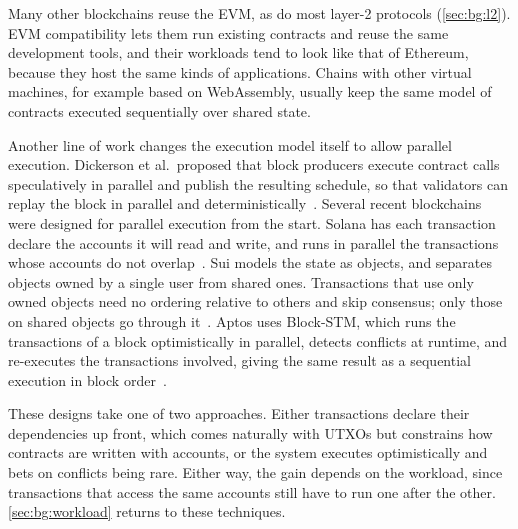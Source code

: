 Many other blockchains reuse the EVM, as do most layer-2 protocols (\autoref{sec:bg:l2}).
EVM compatibility lets them run existing contracts and reuse the same development tools, and their workloads tend to look like that of Ethereum, because they host the same kinds of applications.
Chains with other virtual machines, for example based on WebAssembly, usually keep the same model of contracts executed sequentially over shared state.

Another line of work changes the execution model itself to allow parallel execution.
Dickerson et al.\ proposed that block producers execute contract calls speculatively in parallel and publish the resulting schedule, so that validators can replay the block in parallel and deterministically~\cite{dickerson2017concurrency}.
Several recent blockchains were designed for parallel execution from the start.
Solana has each transaction declare the accounts it will read and write, and runs in parallel the transactions whose accounts do not overlap~\cite{yakovenko2019sealevel}.
Sui models the state as objects, and separates objects owned by a single user from shared ones.
Transactions that use only owned objects need no ordering relative to others and skip consensus; only those on shared objects go through it~\cite{blackshear2024sui}.
Aptos uses Block-STM, which runs the transactions of a block optimistically in parallel, detects conflicts at runtime, and re-executes the transactions involved, giving the same result as a sequential execution in block order~\cite{gelashvili2023blockstm}.

These designs take one of two approaches.
Either transactions declare their dependencies up front, which comes naturally with UTXOs but constrains how contracts are written with accounts, or the system executes optimistically and bets on conflicts being rare.
Either way, the gain depends on the workload, since transactions that access the same accounts still have to run one after the other.
\autoref{sec:bg:workload} returns to these techniques.
